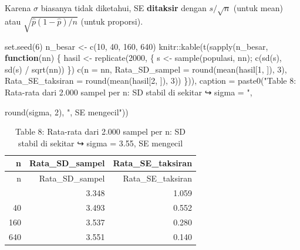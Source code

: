 \documentclass[
  indonesian,
  letterpaper,
]{book}
\newenvironment{Shaded}{\begin{snugshade}}{\end{snugshade}}
\newcommand{\AttributeTok}[1]{\textcolor[rgb]{0.40,0.45,0.13}{#1}}
\newcommand{\ControlFlowTok}[1]{\textcolor[rgb]{0.00,0.23,0.31}{\textbf{#1}}}
\newcommand{\DecValTok}[1]{\textcolor[rgb]{0.68,0.00,0.00}{#1}}
\newcommand{\FunctionTok}[1]{\textcolor[rgb]{0.28,0.35,0.67}{#1}}
\newcommand{\NormalTok}[1]{\textcolor[rgb]{0.00,0.23,0.31}{#1}}
\newcommand{\OtherTok}[1]{\textcolor[rgb]{0.00,0.23,0.31}{#1}}
\newcommand{\SpecialCharTok}[1]{\textcolor[rgb]{0.37,0.37,0.37}{#1}}
\newcommand{\StringTok}[1]{\textcolor[rgb]{0.13,0.47,0.30}{#1}}
\begin{document}
Karena \(\sigma\) biasanya tidak diketahui, SE \textbf{ditaksir} dengan
\(s/\sqrt{n}\) (untuk mean) atau \(\sqrt{\hat{p}(1-\hat{p})/n}\) (untuk
proporsi).

\begin{Shaded}
\begin{Highlighting}[]
\FunctionTok{set.seed}\NormalTok{(}\DecValTok{6}\NormalTok{)}
\NormalTok{n\_besar }\OtherTok{\textless{}{-}} \FunctionTok{c}\NormalTok{(}\DecValTok{10}\NormalTok{, }\DecValTok{40}\NormalTok{, }\DecValTok{160}\NormalTok{, }\DecValTok{640}\NormalTok{)}
\NormalTok{knitr}\SpecialCharTok{::}\FunctionTok{kable}\NormalTok{(}\FunctionTok{t}\NormalTok{(}\FunctionTok{sapply}\NormalTok{(n\_besar, }\ControlFlowTok{function}\NormalTok{(nn) \{}
\NormalTok{hasil }\OtherTok{\textless{}{-}} \FunctionTok{replicate}\NormalTok{(}\DecValTok{2000}\NormalTok{, \{ s }\OtherTok{\textless{}{-}} \FunctionTok{sample}\NormalTok{(populasi, nn); }\FunctionTok{c}\NormalTok{(}\FunctionTok{sd}\NormalTok{(s), }\FunctionTok{sd}\NormalTok{(s) }\SpecialCharTok{/} \FunctionTok{sqrt}\NormalTok{(nn))}
\NormalTok{\})}
\FunctionTok{c}\NormalTok{(}\AttributeTok{n =}\NormalTok{ nn, }\AttributeTok{Rata\_SD\_sampel =} \FunctionTok{round}\NormalTok{(}\FunctionTok{mean}\NormalTok{(hasil[}\DecValTok{1}\NormalTok{, ]), }\DecValTok{3}\NormalTok{),}
\AttributeTok{Rata\_SE\_taksiran =} \FunctionTok{round}\NormalTok{(}\FunctionTok{mean}\NormalTok{(hasil[}\DecValTok{2}\NormalTok{, ]), }\DecValTok{3}\NormalTok{))}
\NormalTok{\})), }\AttributeTok{caption =} \FunctionTok{paste0}\NormalTok{(}\StringTok{"Table 8: Rata{-}rata dari 2.000 sampel per n: SD stabil di sekitar}
\StringTok{↪ sigma = "}\NormalTok{,}

\FunctionTok{round}\NormalTok{(sigma, }\DecValTok{2}\NormalTok{), }\StringTok{", SE mengecil"}\NormalTok{))}
\end{Highlighting}
\end{Shaded}

\begin{longtable}[]{@{}rrr@{}}
\caption{Table 8: Rata-rata dari 2.000 sampel per n: SD stabil di
sekitar ↪ sigma = 3.55, SE mengecil}\tabularnewline
\toprule\noalign{}
n & Rata\_SD\_sampel & Rata\_SE\_taksiran \\
\midrule\noalign{}
\endfirsthead
\toprule\noalign{}
n & Rata\_SD\_sampel & Rata\_SE\_taksiran \\
\midrule\noalign{}
\endhead
\bottomrule\noalign{}
\endlastfoot
10 & 3.348 & 1.059 \\
40 & 3.493 & 0.552 \\
160 & 3.537 & 0.280 \\
640 & 3.551 & 0.140 \\
\end{longtable}
\end{document}

